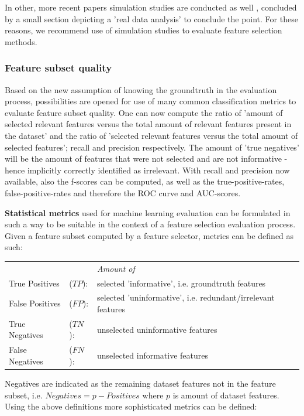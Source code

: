 \documentclass{article}
\begin{document}
In other, more recent papers simulation studies are conducted as well \citep{JMLR:v21:18-567} \citep{JMLR:v21:19-071} \citep{JMLR:v21:19-537}, concluded by a small section depicting a 'real data analysis' to conclude the point. For these reasons, we recommend use of simulation studies to evaluate feature selection methods.

\subsubsection{Feature subset quality}\label{sec:evaluation-statistical-tools}
Based on the new assumption of knowing the groundtruth in the evaluation process, possibilities are opened for use of many common classification metrics to evaluate feature subset quality. One can now compute the ratio of 'amount of selected relevant features versus the total amount of relevant features present in the dataset' and the ratio of 'selected relevant features versus the total amount of selected features'; recall and precision respectively. The amount of 'true negatives' will be the amount of features that were not selected and are not informative - hence implicitly correctly identified as irrelevant. With recall and precision now available, also the f-scores can be computed, as well as the true-positive-rates, false-positive-rates and therefore the ROC curve and AUC-scores.

\textbf{Statistical metrics} used for machine learning evaluation can be formulated in such a way to be suitable in the context of a feature selection evaluation process. Given a feature subset computed by a feature selector, metrics can be defined as such:

\begin{table}[ht]
\begin{tabular}{llll}
 &  & \textit{Amount of} \\
True Positives & ($TP$): & selected 'informative', i.e. groundtruth features \\
False Positives & ($FP$): & selected 'uninformative', i.e. redundant/irrelevant features \\
True Negatives & ($TN$): & unselected uninformative features \\
False Negatives & ($FN$): & unselected informative features \\
\end{tabular}
\end{table}

Negatives are indicated as the remaining dataset features not in the feature subset, i.e. $Negatives = p - Positives$ where $p$ is amount of dataset features. Using the above definitions more sophisticated metrics can be defined:
\end{document}
